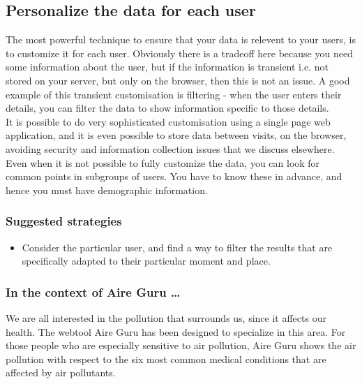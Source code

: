 \subsection{Personalize the data for each user}

The most powerful technique to ensure that your data is relevent to your users, is to customize it 
for each user. Obviously there is a tradeoff here because you need some information about the user,
but if the information is transient i.e. not stored on your server, but only on the browser, then this
is not an issue. A good example of this transient customisation is filtering - when the user enters
their details, you can filter the data to show information specific to those details.\\

It is possible to do very sophisticated customisation using a single page web application, and it is
even possible to store data between visits, on the browser, avoiding security and information collection issues that
we discuss elsewhere. \\

Even when it is not possible to fully customize the data, you can look for common points in subgroups of
users. You have to know these in advance, and hence you must have demographic information. \\

\subsubsection*{Suggested strategies} 

\begin{itemize}
  \item Consider the particular user, and find a way to filter the results that are specifically adapted to their particular moment and place.
\end{itemize}

\subsubsection*{In the context of Aire Guru \ldots}

We are all interested in the pollution that surrounds us, since it affects our health. The webtool
Aire Guru has been designed to specialize in this area. For those people who are especially sensitive to air pollution,
Aire Guru shows the air pollution with respect to the six most common medical conditions that
are affected by air pollutants.\\
 

